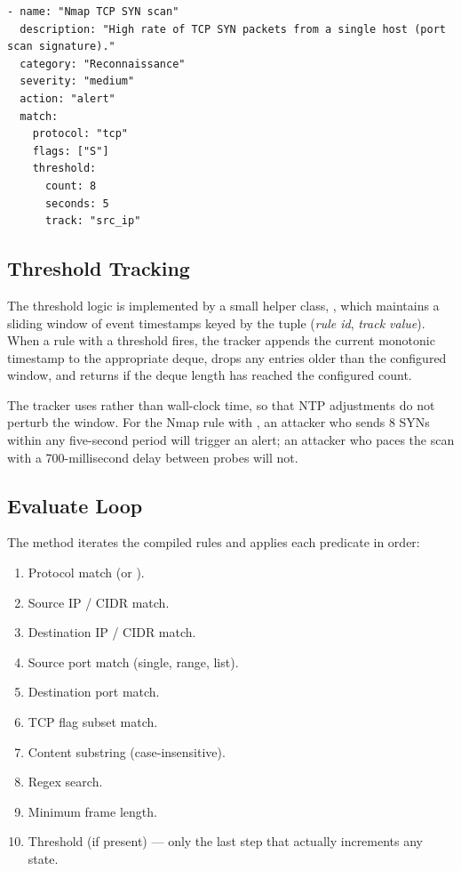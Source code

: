 \begin{lstlisting}[style=yamlfile,caption={The Nmap scan rule, as stored in the seed YAML},label={lst:design-nmap-rule}]
- name: "Nmap TCP SYN scan"
  description: "High rate of TCP SYN packets from a single host (port scan signature)."
  category: "Reconnaissance"
  severity: "medium"
  action: "alert"
  match:
    protocol: "tcp"
    flags: ["S"]
    threshold:
      count: 8
      seconds: 5
      track: "src_ip"
\end{lstlisting}

\subsection{Threshold Tracking}
\label{sec:design-threshold}

The threshold logic is implemented by a small helper class,
, which maintains a sliding window of
event timestamps keyed by the tuple (\emph{rule id}, \emph{track
value}). When a rule with a threshold fires, the tracker appends
the current monotonic timestamp to the appropriate deque, drops any
entries older than the configured window, and returns
 if the deque length has reached the configured count.

The tracker uses  rather than wall-clock
time, so that NTP adjustments do not perturb the window. For the
Nmap rule with , an attacker who sends 8
SYNs within any five-second period will trigger an alert; an
attacker who paces the scan with a 700-millisecond delay between
probes will not.

\subsection{Evaluate Loop}
\label{sec:design-evaluate-loop}

The  method iterates the compiled rules and
applies each predicate in order:

\begin{enumerate}
  \item Protocol match (or ).
  \item Source IP / CIDR match.
  \item Destination IP / CIDR match.
  \item Source port match (single, range, list).
  \item Destination port match.
  \item TCP flag subset match.
  \item Content substring (case-insensitive).
  \item Regex search.
  \item Minimum frame length.
  \item Threshold (if present) --- only the last step that actually
    increments any state.
\end{enumerate}

